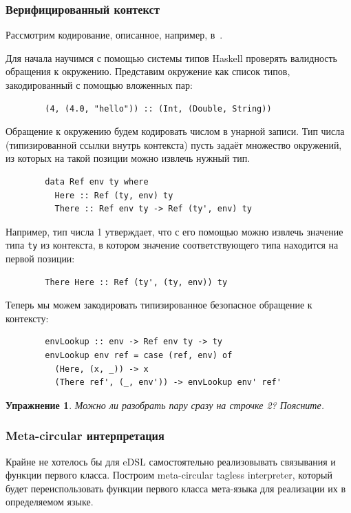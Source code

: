 \documentclass[12pt]{article}
\newtheorem{task}{Упражнение}
\begin{document}
    \subsubsection{Верифицированный контекст}

    Рассмотрим кодирование, описанное, например, в~\cite{kiselyov2012typed}.

    Для начала научимся с помощью системы типов Haskell проверять валидность обращения к окружению.
    Представим окружение как список типов, закодированный с помощью вложенных пар:
    \begin{verbatim}
        (4, (4.0, "hello")) :: (Int, (Double, String))
    \end{verbatim}

    Обращение к окружению будем кодировать числом в унарной записи.
    Тип числа (типизированной ссылки внутрь контекста) пусть задаёт множество окружений, из которых на такой позиции можно извлечь нужный тип.
    \begin{verbatim}
        data Ref env ty where
          Here :: Ref (ty, env) ty
          There :: Ref env ty -> Ref (ty', env) ty
    \end{verbatim}
    Например, тип числа 1 утверждает, что с его помощью можно извлечь значение типа \texttt{ty} из контекста, в котором значение соответствующего типа находится на первой позиции:
    \begin{verbatim}
        There Here :: Ref (ty', (ty, env)) ty
    \end{verbatim}

    Теперь мы можем закодировать типизированное безопасное обращение к контексту:
    \begin{verbatim}
        envLookup :: env -> Ref env ty -> ty
        envLookup env ref = case (ref, env) of
          (Here, (x, _)) -> x
          (There ref', (_, env')) -> envLookup env' ref'
    \end{verbatim}

    \begin{task}
        Можно ли разобрать пару сразу на строчке 2?
        Поясните.
    \end{task}

    \subsubsection{Meta-circular интерпретация}

    Крайне не хотелось бы для eDSL самостоятельно реализовывать связывания и функции первого класса.
    Построим meta-circular tagless interpreter, который будет переиспользовать функции первого класса мета-языка для реализации их в определяемом языке.
\end{document}
